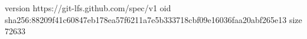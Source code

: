 version https://git-lfs.github.com/spec/v1
oid sha256:88209f41c60847eb178ea57f6211a7e5b333718cbf09e16036faa20abf265e13
size 72633
